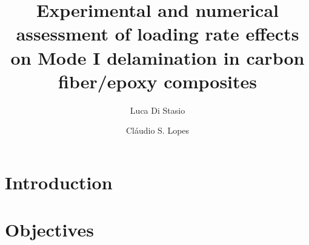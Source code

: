 \documentclass[review]{elsarticle}
\begin{document}
\begin{frontmatter}

\title{Experimental and numerical assessment of loading rate effects on Mode I delamination in carbon fiber/epoxy composites}


\author[nancy,lulea]{Luca Di Stasio}
\author[madrid]{Cl\'audio S. Lopes}


\address[nancy]{Universit\'e de Lorraine, EEIGM, IJL, 6 Rue Bastien Lepage, F-54010 Nancy, France}
\address[lulea]{Lule\aa\ University of Technology, University Campus, SE-97187 Lule\aa, Sweden}
\address[madrid]{IMDEA Materials Institute, Getafe, Madrid, Spain}
\begin{abstract}
\noindent

\end{abstract}


\end{frontmatter}

\linenumbers

\section{Introduction}



\section{Objectives}
\end{document}
